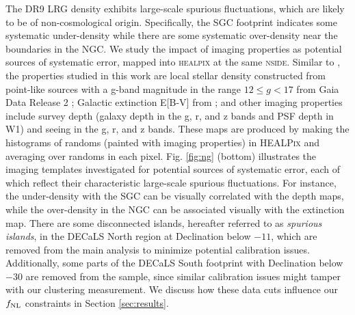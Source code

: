 The DR9 LRG density exhibits large-scale spurious fluctuations, which are likely to be of non-cosmological origin. Specifically, the SGC footprint indicates some systematic under-density while there are some systematic over-density near the boundaries in the NGC. We study the impact of imaging properties as potential sources of systematic error, mapped into \textsc{healpix} at the same \textsc{nside}. Similar to \cite{zhou2022target}, the properties studied in this work are local stellar density constructed from point-like sources with a g-band magnitude in the range $12 \leq g < 17$ from Gaia Data Release 2 \citep[see,][]{gaiadr2, myers2022};  Galactic extinction E[B-V] from \cite{schlegel1998maps}; and other imaging properties include survey depth (galaxy depth in the g, r, and z bands and PSF depth in W1) and seeing in the g, r, and z bands. These maps are produced by making the histograms of randoms (painted with imaging properties) in \textsc{HEALPix} and averaging over randoms in each pixel. Fig. \ref{fig:ng} (bottom) illustrates the imaging templates investigated for potential sources of systematic error, each of which reflect their characteristic large-scale spurious fluctuations. For instance, the under-density with the SGC can be visually correlated with the depth maps, while the over-density in the NGC can be associated visually with the extinction map. There are some disconnected islands, hereafter referred to as \textit{spurious islands}, in the DECaLS North region at Declination below $-11$, which are removed from the main analysis to minimize potential calibration issues. Additionally, some parts of the DECaLS South footprint with Declination below $-30$ are removed from the sample, since similar calibration issues might tamper with our clustering measurement. We discuss how these data cuts influence our $f_{\rm NL}$ constraints in Section \ref{sec:results}. 

